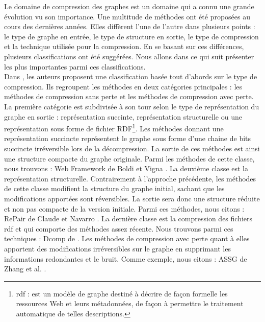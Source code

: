 Le domaine de compression des graphes est un domaine qui a connu une grande évolution vu son importance. Une multitude de méthodes ont été proposées au cours des dernières années. Elles diffèrent l'une de l'autre dans plusieurs points : le type de graphe en entrée, le type de structure en sortie, le type de compression et la technique utilisée pour la compression. En se basant sur ces différences, plusieurs classifications ont été suggérées. Nous allons dans ce qui suit présenter les plus importantes parmi ces classifications.\\

Dans \citep{maneth2015survey}, les auteurs proposent une classification basée tout d'abords sur le type de compression. Ils regroupent les méthodes en deux catégories principales : les méthodes de compression sans perte et les méthodes de compression avec perte. La première catégorie est subdivisée à son tour selon le type de représentation du graphe en sortie : représentation succinte, représentation structurelle ou une représentation sous forme de fichier RDF\footnote{\gls{rdf} : est un modèle de graphe destiné à décrire de façon formelle les ressources Web et leurs métadonnées, de façon à permettre le traitement automatique de telles descriptions.}. 
Les méthodes donnant une représentation succincte représentent le graphe sous forme d'une chaine de bits succincte irréversible lors de la décompression. La sortie de ces méthodes est ainsi une structure compacte du graphe originale. Parmi les méthodes de cette classe, nous trouvons : Web Framework de Boldi et Vigna \citep{boldi2004webgraph}. La deuxième classe est la représentation structurelle. Contrairement à l'approche précédente, les méthodes de cette classe modifient la structure du graphe initial, sachant que les modifications apportées sont réversibles. La sortie sera donc une structure réduite et non pas compacte de la version initiale. Parmi ces méthodes, nous citons : RePair de Claude et Navarro \citep{claude2010fast}. La dernière classe est la compression  des fichiers \gls{rdf} et qui comporte des méthodes assez récente. Nous trouvons parmi ces techniques : Dcomp de \citep{martinez2012compression} . Les méthodes de compression avec perte quant à elles apportent des modifications irréversibles sur le graphe en supprimant les informations redondantes et le bruit. Comme exemple, nous citons : ASSG de Zhang et al. \citep{zhang2014assg}.\\

